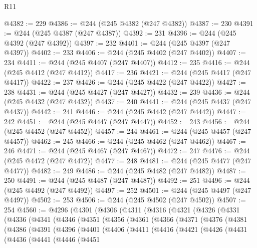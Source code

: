 \begin{lexlean}{R11}
\begin{coremodule}
@4382 := 229
@4386 := @244 (@245 @4382 (@247 @4382))
@4387 := 230
@4391 := @244 (@245 @4387 (@247 @4387))
@4392 := 231
@4396 := @244 (@245 @4392 (@247 @4392))
@4397 := 232
@4401 := @244 (@245 @4397 (@247 @4397))
@4402 := 233
@4406 := @244 (@245 @4402 (@247 @4402))
@4407 := 234
@4411 := @244 (@245 @4407 (@247 @4407))
@4412 := 235
@4416 := @244 (@245 @4412 (@247 @4412))
@4417 := 236
@4421 := @244 (@245 @4417 (@247 @4417))
@4422 := 237
@4426 := @244 (@245 @4422 (@247 @4422))
@4427 := 238
@4431 := @244 (@245 @4427 (@247 @4427))
@4432 := 239
@4436 := @244 (@245 @4432 (@247 @4432))
@4437 := 240
@4441 := @244 (@245 @4437 (@247 @4437))
@4442 := 241
@4446 := @244 (@245 @4442 (@247 @4442))
@4447 := 242
@4451 := @244 (@245 @4447 (@247 @4447))
@4452 := 243
@4456 := @244 (@245 @4452 (@247 @4452))
@4457 := 244
@4461 := @244 (@245 @4457 (@247 @4457))
@4462 := 245
@4466 := @244 (@245 @4462 (@247 @4462))
@4467 := 246
@4471 := @244 (@245 @4467 (@247 @4467))
@4472 := 247
@4476 := @244 (@245 @4472 (@247 @4472))
@4477 := 248
@4481 := @244 (@245 @4477 (@247 @4477))
@4482 := 249
@4486 := @244 (@245 @4482 (@247 @4482))
@4487 := 250
@4491 := @244 (@245 @4487 (@247 @4487))
@4492 := 251
@4496 := @244 (@245 @4492 (@247 @4492))
@4497 := 252
@4501 := @244 (@245 @4497 (@247 @4497))
@4502 := 253
@4506 := @244 (@245 @4502 (@247 @4502))
@4507 := 254
@4560 := @4296
    (@4301
      (@4306
        (@4311
          (@4316
            (@4321
              (@4326
                (@4331
                  (@4336
                    (@4341
                      (@4346
                        (@4351
                          (@4356
                            (@4361
                              (@4366
                                (@4371
                                  (@4376
                                    (@4381
                                      (@4386
                                        (@4391
                                          (@4396
                                            (@4401
                                              (@4406
                                                (@4411
                                                  (@4416
                                                    (@4421
                                                      (@4426
                                                        (@4431
                                                          (@4436
                                                            (@4441
                                                              (@4446
                                                                (@4451

\end{coremodule}
\end{lexlean}
